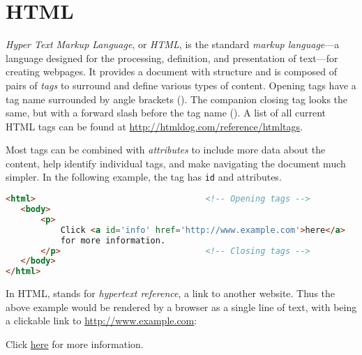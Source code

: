 
\section*{HTML} %

\emph{Hyper Text Markup Language}, or \emph{HTML}, is the standard \emph{markup language}---a language designed for the processing, definition, and presentation of text---for creating webpages.
It provides a document with structure and is composed of pairs of \emph{tags} to surround and define various types of content.
Opening tags have a tag name surrounded by angle brackets ().
The companion closing tag looks the same, but with a forward slash before the tag name ().
A list of all current HTML tags can be found at \url{http://htmldog.com/reference/htmltags}.

Most tags can be combined with \emph{attributes} to include more data about the content, help identify individual tags, and make navigating the document much simpler.
In the following example, the  tag has \lstinline[language=HTML]{id} and  attributes.

\begin{lstlisting}[language=HTML]
<html>                                  <!-- Opening tags -->
   <body>
       <p>
           Click <a id='info' href='http://www.example.com'>here</a>
           for more information.
       </p>                             <!-- Closing tags -->
   </body>
</html>
\end{lstlisting}

In HTML,  stands for \emph{hypertext reference}, a link to another website.
Thus the above example would be rendered by a browser as a single line of text, with  being a clickable link to \url{http://www.example.com}:

\begin{center}
Click \href{http://www.example.com}{here} for more information.
\end{center}

